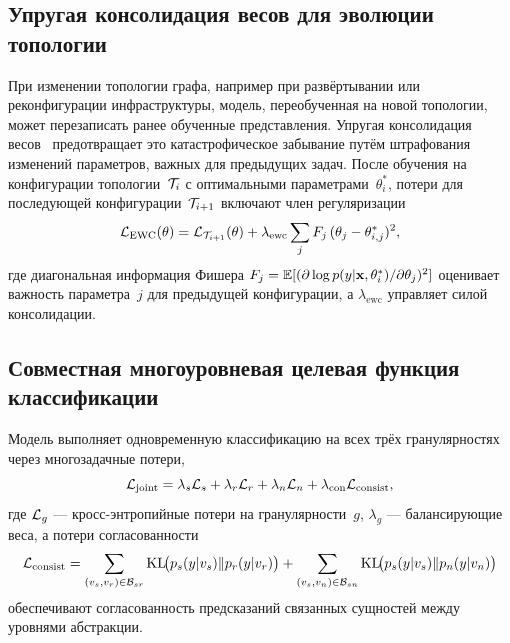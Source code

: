 \subsection{Упругая консолидация весов для эволюции топологии}

При изменении топологии графа, например при развёртывании или реконфигурации инфраструктуры, модель, переобученная на новой топологии, может перезаписать ранее обученные представления. Упругая консолидация весов~\cite{Kirkpatrick2017,Zenke2017} предотвращает это катастрофическое забывание путём штрафования изменений параметров, важных для предыдущих задач. После обучения на конфигурации топологии~$\mathcal{T}_i$ с оптимальными параметрами~$\theta_i^*$, потери для последующей конфигурации~$\mathcal{T}_{i+1}$ включают член регуляризации
\begin{equation}
\mathcal{L}_{\mathrm{EWC}}(\theta)
= \mathcal{L}_{\mathcal{T}_{i+1}}(\theta)
  + \lambda_{\mathrm{ewc}}\sum_j F_j\,(\theta_j - \theta_{i,j}^*)^2,
\label{eq:ewc}
\end{equation}
где диагональная информация Фишера $F_j = \mathbb{E}[(\partial\log p(y|\mathbf{x},\theta_i^*)/\partial\theta_j)^2]$ оценивает важность параметра~$j$ для предыдущей конфигурации, а $\lambda_{\mathrm{ewc}}$ управляет силой консолидации.

\subsection{Совместная многоуровневая целевая функция классификации}

Модель выполняет одновременную классификацию на всех трёх гранулярностях через многозадачные потери,
\begin{equation}
\mathcal{L}_{\mathrm{joint}}
= \lambda_s\mathcal{L}_s + \lambda_r\mathcal{L}_r + \lambda_n\mathcal{L}_n
  + \lambda_{\mathrm{con}}\mathcal{L}_{\mathrm{consist}},
\label{eq:triple_joint}
\end{equation}
где $\mathcal{L}_g$ --- кросс-энтропийные потери на гранулярности~$g$, $\lambda_g$ --- балансирующие веса, а потери согласованности
\begin{equation}
\mathcal{L}_{\mathrm{consist}}
= \sum_{(v_s,v_r)\in\mathcal{B}_{sr}}
  \mathrm{KL}\!\bigl(p_s(y|v_s)\|p_r(y|v_r)\bigr)
+ \sum_{(v_s,v_n)\in\mathcal{B}_{sn}}
  \mathrm{KL}\!\bigl(p_s(y|v_s)\|p_n(y|v_n)\bigr)
\label{eq:triple_consist}
\end{equation}
обеспечивают согласованность предсказаний связанных сущностей между уровнями абстракции.

